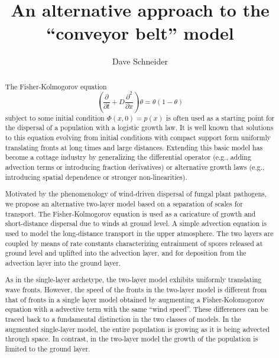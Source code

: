 \documentclass[12pt]{amsart}
\begin{document}
\author{Dave Schneider}
\address{Plant-Microbe Interaction Research Unit\\
  R.W.\ Holley Center \\
  USDA Agricultural Research Service \\
  538 Tower Road \\ Ithaca, NY 14583}

\title{An alternative approach to the ``conveyor belt'' model}


\begin{abstract}
  The Fisher-Kolmogorov equation
  \begin{displaymath}
    \left(\frac{\partial}{\partial t} + D\frac{\partial^2}{\partial
      x}\right)\theta = \theta(1-\theta)
  \end{displaymath}
  subject to some initial condition $\Phi(x, 0) = p(x)$ is often used
  as a starting point for the dispersal of a population with a
  logistic growth law.  It is well known that solutions to this
  equation evolving from initial conditions with compact support form
  uniformly translating fronts at long times and large distances.
  Extending this basic model has become a cottage industry by
  generalizing the differential operator (e.g., adding advection terms
  or introducing fraction derivatives) or alternative growth laws
  (e.g., introducing spatial dependence or stronger non-linearities).

  Motivated by the phenomenology of wind-driven dispersal of fungal
  plant pathogens, we propose an alternative two-layer model based on
  a separation of scales for transport.  The Fisher-Kolmogorov
  equation is used as a caricature of growth and short-distance
  dispersal due to winds at ground level.  A simple advection equation
  is used to model the long-distance transport in the upper
  atmosphere.  The two layers are coupled by means of rate constants
  characterizing entrainment of spores released at ground level and
  uplifted into the advection layer, and for deposition from the
  advection layer into the ground layer.

  As in the single-layer archetype, the two-layer model exhibits
  uniformly translating wave fronts.  However, the speed of the fronts
  in the two-layer model is different from that of fronts in a single layer
  model obtained by augmenting a Fisher-Kolomogorov equation with a
  advective term with the same ``wind speed''.  These differences can
  be traced back to a fundamental distinction in the two classes of models.  In
  the augmented single-layer model, the entire population is growing
  as it is being advected through space.  In contrast, in the
  two-layer model the growth of the population is limited to the
  ground layer.
\end{abstract}
\end{document}

